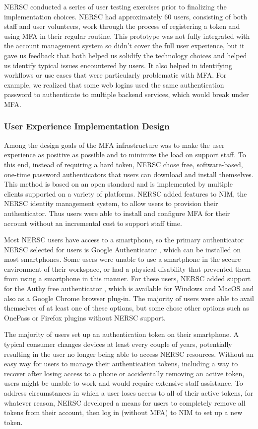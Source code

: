\documentclass[sigconf,review]{acmart}
\begin{document}
NERSC conducted a series of user testing exercises prior to finalizing the
implementation choices.  NERSC had approximately 60 users, consisting of both
staff and user volunteers, work through the process of registering a token and
using MFA in their regular routine.  This prototype was not fully integrated
with the account management system so didn't cover the full user experience, but
it gave us feedback that both helped us solidify the technology choices and
helped us identify typical issues encountered by users.  It also helped in
identifying workflows or use cases that were particularly problematic with MFA.
For example, we realized that some web logins used the same authentication
password to authenticate to multiple backend services, which would break under
MFA.

\subsubsection{User Experience Implementation Design}
\label{user}

Among the design goals of the MFA infrastructure was to make the user experience
as positive as possible and to minimize the load on support staff. To this end,
instead of requiring a hard token, NERSC chose free, software-based, one-time
password authenticators \cite{m2011totp} that users can download and install
themselves. This method is based on an open standard and is implemented by
multiple clients supported on a variety of platforms.  NERSC added features to
NIM, the NERSC identity management system, to allow users to provision their
authenticator. Thus users were able to install and configure MFA for their
account without an incremental cost to support staff time.

Most NERSC users have access to a smartphone, so the primary authenticator NERSC
selected for users is Google Authenticator \cite{gauth}, which can be installed
on most smartphones. Some users were unable to use a smartphone in the secure
environment of their workspace, or had a physical disability that prevented them
from using a smartphone in this manner. For these users, NERSC added support for
the Authy free authenticator \cite{authy}, which is available for Windows and
MacOS and also as a Google Chrome browser plug-in. The majority of users were
able to avail themselves of at least one of these options, but some chose other
options such as OnePass or Firefox plugins without NERSC support.

The majority of users set up an authentication token on their smartphone. A
typical consumer changes devices at least every couple of years, potentially
resulting in the user no longer being able to access NERSC resources. Without an
easy way for users to manage their authentication tokens, including a way to
recover after losing access to a phone or accidentally removing an active token,
users might be unable to work and would require extensive staff assistance. To
address circumstances in which a user loses access to all of their active
tokens, for whatever reason, NERSC developed a means for users to completely
remove all tokens from their account, then log in (without MFA) to NIM to set up
a new token.
\end{document}
